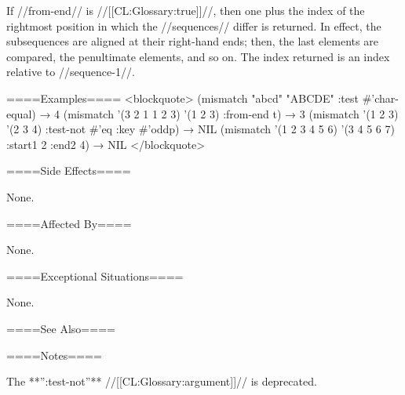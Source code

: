 If //from-end// is //[[CL:Glossary:true]]//, then one plus the index of the rightmost position in which the //sequences// differ is returned. In effect, the subsequences are aligned at their right-hand ends; then, the last elements are compared, the penultimate elements, and so on. The index returned is an index relative to //sequence-1//.

====Examples==== <blockquote> (mismatch "abcd" "ABCDE" :test #'char-equal) → 4 (mismatch '(3 2 1 1 2 3) '(1 2 3) :from-end t) → 3 (mismatch '(1 2 3) '(2 3 4) :test-not #'eq :key #'oddp) → NIL (mismatch '(1 2 3 4 5 6) '(3 4 5 6 7) :start1 2 :end2 4) → NIL </blockquote>

====Side Effects====

None.

====Affected By====

None.

====Exceptional Situations====

None.

====See Also====

{\secref\TraversalRules}

====Notes====


The **'':test-not''** //[[CL:Glossary:argument]]// is deprecated.

   
